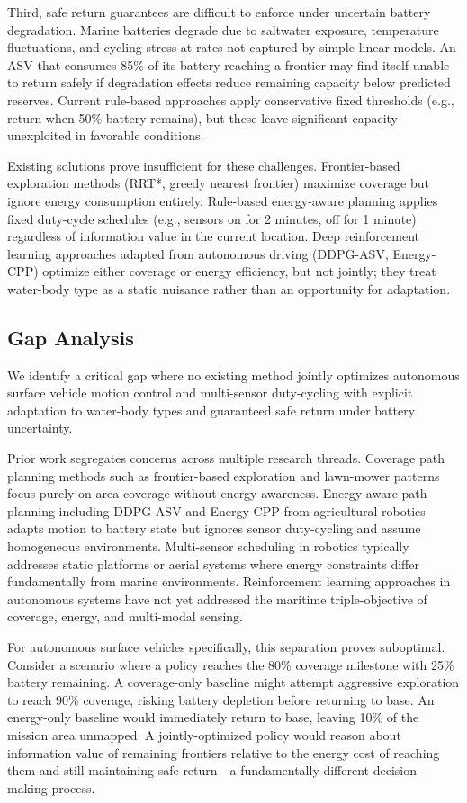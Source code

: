 Third, safe return guarantees are difficult to enforce under uncertain battery degradation. Marine batteries degrade due to saltwater exposure, temperature fluctuations, and cycling stress at rates not captured by simple linear models. An ASV that consumes 85\% of its battery reaching a frontier may find itself unable to return safely if degradation effects reduce remaining capacity below predicted reserves. Current rule-based approaches apply conservative fixed thresholds (e.g., return when 50\% battery remains), but these leave significant capacity unexploited in favorable conditions.

Existing solutions prove insufficient for these challenges. Frontier-based exploration methods (RRT*, greedy nearest frontier) maximize coverage but ignore energy consumption entirely. Rule-based energy-aware planning applies fixed duty-cycle schedules (e.g., sensors on for 2 minutes, off for 1 minute) regardless of information value in the current location. Deep reinforcement learning approaches adapted from autonomous driving (DDPG-ASV, Energy-CPP) optimize either coverage or energy efficiency, but not jointly; they treat water-body type as a static nuisance rather than an opportunity for adaptation.

\subsection{Gap Analysis}

We identify a critical gap where no existing method jointly optimizes autonomous surface vehicle motion control and multi-sensor duty-cycling with explicit adaptation to water-body types and guaranteed safe return under battery uncertainty.

Prior work segregates concerns across multiple research threads. Coverage path planning methods such as frontier-based exploration and lawn-mower patterns focus purely on area coverage without energy awareness. Energy-aware path planning including DDPG-ASV and Energy-CPP from agricultural robotics adapts motion to battery state but ignores sensor duty-cycling and assume homogeneous environments. Multi-sensor scheduling in robotics typically addresses static platforms or aerial systems where energy constraints differ fundamentally from marine environments. Reinforcement learning approaches in autonomous systems have not yet addressed the maritime triple-objective of coverage, energy, and multi-modal sensing.

For autonomous surface vehicles specifically, this separation proves suboptimal. Consider a scenario where a policy reaches the 80\% coverage milestone with 25\% battery remaining. A coverage-only baseline might attempt aggressive exploration to reach 90\% coverage, risking battery depletion before returning to base. An energy-only baseline would immediately return to base, leaving 10\% of the mission area unmapped. A jointly-optimized policy would reason about information value of remaining frontiers relative to the energy cost of reaching them and still maintaining safe return—a fundamentally different decision-making process.

